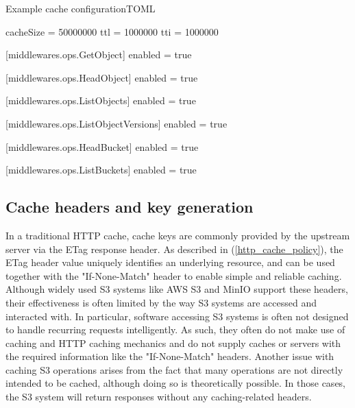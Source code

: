 \begin{codeblock}{Example cache configuration}{TOML}
	\begin{javacode}
		cacheSize = 50000000
		ttl = 1000000
		tti = 1000000
		
		[middlewares.ops.GetObject]
		enabled = true
		
		[middlewares.ops.HeadObject]
		enabled = true
		
		[middlewares.ops.ListObjects]
		enabled = true
		
		[middlewares.ops.ListObjectVersions]
		enabled = true
		
		[middlewares.ops.HeadBucket]
		enabled = true
		
		[middlewares.ops.ListBuckets]
		enabled = true
	\end{javacode}
\end{codeblock}

\subsection{Cache headers and key generation}

In a traditional HTTP cache, cache keys are commonly provided by the upstream server via the ETag response header. As described in (\ref{http_cache_policy}), the ETag header value uniquely identifies an underlying resource, and can be used together with the "If-None-Match" header to enable simple and reliable caching. Although widely used S3 systems like AWS S3 and MinIO support these headers, their effectiveness is often limited by the way S3 systems are accessed and interacted with.
In particular, software accessing S3 systems is often not designed to handle recurring requests intelligently. As such, they often do not make use of caching and HTTP caching mechanics and do not supply caches or servers with the required information like the "If-None-Match" headers. Another issue with caching S3 operations arises from the fact that many operations are not directly intended to be cached, although doing so is theoretically possible. In those cases, the S3 system will return responses without any caching-related headers.

